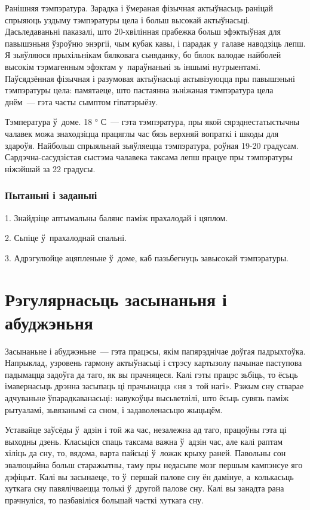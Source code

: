Ранішняя тэмпэратура. Зарадка і ўмераная фізычная актыўнасьць раніцай спрыяюць уздыму тэмпэратуры цела і больш высокай актыўнасьці. Дасьледаваньні паказалі, што 20-хвілінная прабежка больш эфэктыўная для павышэньня ўзроўню энэргіі, чым кубак кавы, і парадак у~галаве наводзіць лепш. Я зьяўляюся прыхільнікам бялковага сьняданку, бо бялок валодае найболей высокім тэрмагенным эфэктам у~параўнаньні зь іншымі нутрыентамі. Паўсядзённая фізычная і разумовая актыўнасьці актывізуюцца пры павышэньні тэмпэратуры цела: памятаеце, што пастаянна зьніжаная тэмпэратура цела днём~--- гэта часты сымптом гіпатэрыёзу.

Тэмпература ў~доме. 18 ° С~--- гэта тэмпэратура, пры якой сярэднестатыстычны чалавек можа знаходзіцца працяглы час бязь верхняй вопраткі і шкоды для здароўя. Найбольш спрыяльнай зьяўляецца тэмпэратура, роўная 19-20 градусам. Сардэчна-сасудзістая сыстэма чалавека таксама лепш працуе пры тэмпэратуры ніжэйшай за 22 градусы.

\subsubsection{Пытаньні і заданьні}

1. Знайдзіце аптымальны балянс паміж прахалодай і цяплом.

2. Сьпіце ў~прахалоднай спальні.

3. Адрэгулюйце ацяпленьне ў~доме, каб пазьбегнуць завысокай тэмпэратуры.


\section{Рэгулярнасьць засынаньня і абуджэньня}

Засынаньне і абуджэньне~--- гэта працэсы, якім папярэднічае доўгая падрыхтоўка. Напрыклад, узровень гармону актыўнасьці і стрэсу картызолу пачынае паступова падымацца задоўга да таго, як вы прачняцеся. Калі гэты працэс зьбіць, то ёсьць імавернасьць дрэнна засыпаць ці прачынацца «ня з~той нагі». Рэжым сну стварае адчуваньне ўпарадкаванасьці: навукоўцы высьветлілі, што ёсьць сувязь паміж рытуаламі, зьвязанымі са сном, і задаволенасьцю жыцьцём.

Уставайце заўсёды ў~адзін і той жа час, незалежна ад таго, працоўны гэта ці выходны дзень. Класьціся спаць таксама важна ў~адзін час, але калі раптам хіліць да сну, то, вядома, варта пайсьці ў~ложак крыху раней. Павольны сон эвалюцыйна больш старажытны, таму пры недасыпе мозг першым кампэнсуе яго дэфіцыт. Калі вы засынаеце, то ў~першай палове сну ён дамінуе, а~колькасьць хуткага сну павялічваецца толькі ў~другой палове сну. Калі вы занадта рана прачнуліся, то пазбавіліся большай часткі хуткага сну.

